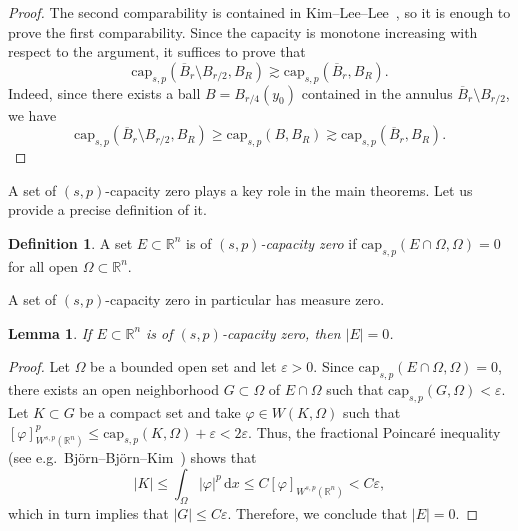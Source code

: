 \documentclass[11pt]{amsart}
\theoremstyle{plain}
\newtheorem{lemma}[theorem]{Lemma}
\theoremstyle{definition}
\newtheorem{definition}[theorem]{Definition}
\numberwithin{equation}{section}
\begin{document}
\begin{proof}
The second comparability is contained in Kim--Lee--Lee~\cite[Lemma~2.17]{KLL23}, so it is enough to prove the first comparability. Since the capacity is monotone increasing with respect to the argument, it suffices to prove that
	\begin{equation*}
		\mathrm{cap}_{s, p}(\overline{B}_r \setminus B_{r/2}, B_R) \gtrsim \mathrm{cap}_{s, p}(\overline{B}_r, B_R).
	\end{equation*}
	Indeed, since there exists a ball $B=B_{r/4}(y_0)$ contained in the annulus $\overline{B}_r \setminus B_{r/2}$, we have
	\begin{equation*}
		\mathrm{cap}_{s, p}(\overline{B}_r \setminus B_{r/2}, B_R) \geq \mathrm{cap}_{s, p}(B, B_R) \gtrsim \mathrm{cap}_{s, p}(\overline{B}_r, B_R).
	\end{equation*}
\end{proof}

A set of $(s, p)$-capacity zero plays a key role in the main theorems. Let us provide a precise definition of it.

\begin{definition}
    A set $E \subset \mathbb{R}^n$ is of \emph{$(s, p)$-capacity zero} if $\mathrm{cap}_{s, p}(E \cap \Omega, \Omega)=0$ for all open $\Omega \subset \mathbb{R}^n$.
\end{definition}

A set of $(s, p)$-capacity zero in particular has measure zero.

\begin{lemma}\label{lem-measurezero}
    If $E \subset \mathbb{R}^n$ is of $(s, p)$-capacity zero, then $|E|=0$.
\end{lemma}

\begin{proof}
Let $\Omega$ be a bounded open set and let $\varepsilon >0$. Since $\mathrm{cap}_{s, p}(E \cap \Omega, \Omega)=0$, there exists an open neighborhood $G \subset \Omega$ of $E \cap \Omega$ such that $\mathrm{cap}_{s, p}(G, \Omega) < \varepsilon$. Let $K \subset G$ be a compact set and take $\varphi \in W(K, \Omega)$ such that $[\varphi]_{W^{s, p}(\mathbb{R}^n)}^p \leq \mathrm{cap}_{s, p}(K, \Omega) + \varepsilon < 2\varepsilon$. Thus, the fractional Poincar\'e inequality (see e.g.\ Bj\"orn--Bj\"orn--Kim~\cite[(5.6)]{BBK24}) shows that
\begin{equation*}
    |K| \leq \int_\Omega |\varphi|^p \,\mathrm{d}x \leq C [\varphi]_{W^{s, p}(\mathbb{R}^n)} < C\varepsilon,
\end{equation*}
which in turn implies that $|G| \leq C\varepsilon$. Therefore, we conclude that $|E|=0$.
\end{proof}
\end{document}
